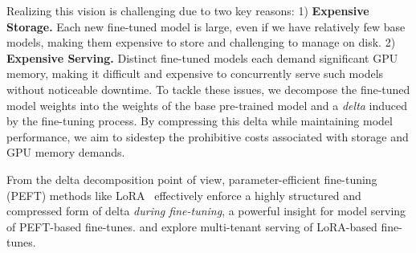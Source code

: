 \documentclass[numbers]{article}
\begin{document}
Realizing this vision is challenging due to two key reasons: 1) \textbf{Expensive Storage.} Each new fine-tuned model is large, even if we have relatively few base models, making them expensive to store and challenging to manage on disk. 2) \textbf{Expensive Serving.} Distinct fine-tuned models each demand significant GPU memory, making it difficult and expensive to concurrently serve such models without noticeable downtime. To tackle these issues, we decompose the fine-tuned model weights into the weights of the base pre-trained model and a \emph{delta} induced by the fine-tuning process. By compressing this delta while maintaining model performance, we aim to sidestep the prohibitive costs associated with storage and GPU memory demands.

From the delta decomposition point of view, parameter-efficient fine-tuning (PEFT) methods like LoRA~\citep{hu2021lora,houlsby2019parameter, rebuffi2017learning,dettmers2023qlora,chen2023longlora} effectively enforce a highly structured and compressed form of delta \emph{during fine-tuning}, a powerful insight for model serving of PEFT-based fine-tunes. \citet{sheng2023slora} and \citet{punica} explore multi-tenant serving of LoRA-based fine-tunes.
\end{document}
